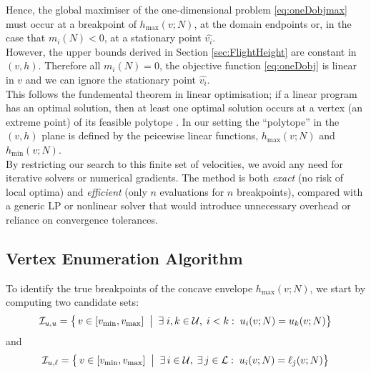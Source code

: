 \documentclass[11pt]{article}
\begin{document}
Hence, the global maximiser of the one-dimensional problem \ref{eq:oneDobjmax} must occur at a breakpoint of $h_{\max}(v;N)$, at the domain endpoints or, in the case that $m_i(N) < 0$, at a stationary point $\hat{v_i}$.\\

However, the upper bounds derived in Section \ref{sec:FlightHeight} are constant in $(v,h)$. Therefore all $m_i(N) = 0$, the objective function \ref{eq:oneDobj} is linear in $v$ and we can ignore the stationary point $\hat{v_i}$. \\

This follows the fundemental theorem in linear optimisation; if a linear program has an optimal solution, then at least one optimal solution occurs at a vertex (an extreme point) of its feasible polytope \cite{bertsimasIntroductionLinearOptimization1997}. In our setting the “polytope” in the $(v,h)$ plane is defined by the peicewise linear functions, $h_{\max}(v;N)$ and $h_{\min}(v;N)$.\\


By restricting our search to this finite set of velocities, we avoid any need for iterative solvers or numerical gradients. The method is both \emph{exact} (no risk of local optima) and \emph{efficient} (only $n$ evaluations for $n$ breakpoints), compared with a generic LP or nonlinear solver that would introduce unnecessary overhead or reliance on convergence tolerances.

\subsection{Vertex Enumeration Algorithm}

To identify the true breakpoints of the concave envelope $h_{\max}(v;N)$, we start by computing two candidate sets:
\begin{align}
  \mathcal{I}_{u,u} = \bigl\{\,v\in[v_{\min},v_{\max}]\;\bigm|\;\exists\;i,k\in\mathcal U,\;i<k:\;u_i(v;N)=u_k(v;N)\bigr\}
\end{align}
and 
\begin{align}
  \mathcal I_{u,\ell} = \bigl\{\,v\in[v_{\min},v_{\max}]\;\bigm|\;\exists\,i\in\mathcal U,\;\exists\,j\in\mathcal L:\;u_i(v;N)=\ell_j(v;N)\bigr\}
\end{align}
\end{document}
